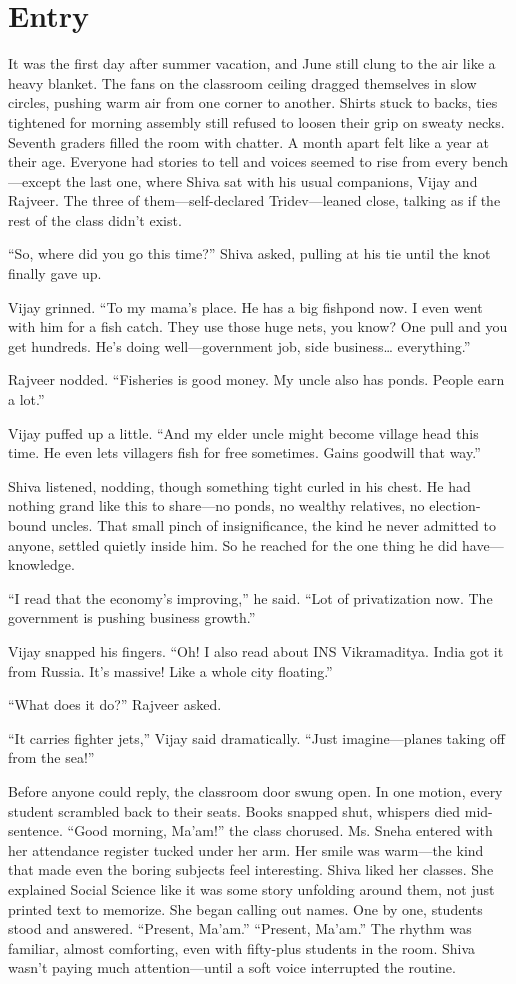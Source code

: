 \chapter{Entry}
It was the first day after summer vacation, and June still clung to the air like a heavy blanket. The fans on the classroom ceiling dragged themselves in slow circles, pushing warm air from one corner to another. Shirts stuck to backs, ties tightened for morning assembly still refused to loosen their grip on sweaty necks. Seventh graders filled the room with chatter. A month apart felt like a year at their age. Everyone had stories to tell and voices seemed to rise from every bench—except the last one, where Shiva sat with his usual companions, Vijay and Rajveer. The three of them—self-declared Tridev—leaned close, talking as if the rest of the class didn't exist.

``So, where did you go this time?'' Shiva asked, pulling at his tie until the knot finally gave up.

Vijay grinned. ``To my mama's place. He has a big fishpond now. I even went with him for a fish catch. They use those huge nets, you know? One pull and you get hundreds. He's doing well—government job, side business… everything.''

Rajveer nodded. ``Fisheries is good money. My uncle also has ponds. People earn a lot.''

Vijay puffed up a little. ``And my elder uncle might become village head this time. He even lets villagers fish for free sometimes. Gains goodwill that way.''

Shiva listened, nodding, though something tight curled in his chest. He had nothing grand like this to share—no ponds, no wealthy relatives, no election-bound uncles. That small pinch of insignificance, the kind he never admitted to anyone, settled quietly inside him. So he reached for the one thing he did have—knowledge.

``I read that the economy's improving,'' he said. ``Lot of privatization now. The government is pushing business growth.''

Vijay snapped his fingers. ``Oh! I also read about INS Vikramaditya. India got it from Russia. It's massive! Like a whole city floating.''

``What does it do?'' Rajveer asked.

``It carries fighter jets,'' Vijay said dramatically. ``Just imagine—planes taking off from the sea!''

Before anyone could reply, the classroom door swung open. In one motion, every student scrambled back to their seats. Books snapped shut, whispers died mid-sentence. ``Good morning, Ma'am!'' the class chorused. Ms. Sneha entered with her attendance register tucked under her arm. Her smile was warm—the kind that made even the boring subjects feel interesting. Shiva liked her classes. She explained Social Science like it was some story unfolding around them, not just printed text to memorize. She began calling out names. One by one, students stood and answered. ``Present, Ma'am.'' ``Present, Ma'am.'' The rhythm was familiar, almost comforting, even with fifty-plus students in the room. Shiva wasn't paying much attention—until a soft voice interrupted the routine.

